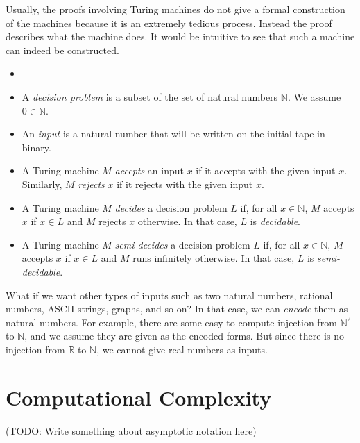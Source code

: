 	Usually, the proofs involving Turing machines do not give a formal construction of the machines because it is an extremely tedious process. Instead the proof describes what the machine does. It would be intuitive to see that such a machine can indeed be constructed.
	
	\begin{defn} \label{def_problem} \begin{itemize}
	    \item []
	    \item A \emph{decision problem} is a subset of the set of natural numbers $\mathbb{N}$. We assume $0 \in \mathbb{N}$.
	    \item An \emph{input} is a natural number that will be written on the initial tape in binary.
	    \item A Turing machine $M$ \emph{accepts} an input $x$ if it accepts with the given input $x$. Similarly, $M$ \emph{rejects} $x$ if it rejects with the given input $x$.
	    \item A Turing machine $M$ \emph{decides} a decision problem $L$ if, for all $x \in \mathbb{N}$, $M$ accepts $x$ if $x \in L$ and $M$ rejects $x$ otherwise. In that case, $L$ is \emph{decidable}.
	    \item A Turing machine $M$ \emph{semi-decides} a decision problem $L$ if, for all $x \in \mathbb{N}$, $M$ accepts $x$ if $x \in L$ and $M$ runs infinitely otherwise. In that case, $L$ is \emph{semi-decidable}.
	\end{itemize} \end{defn}
	
	What if we want other types of inputs such as two natural numbers, rational numbers, ASCII strings, graphs, and so on? In that case, we can \emph{encode} them as natural numbers. For example, there are some easy-to-compute injection from $\mathbb{N}^2$ to $\mathbb{N}$, and we assume they are given as the encoded forms. But since there is no injection from $\mathbb{R}$ to $\mathbb{N}$, we cannot give real numbers as inputs.

    \section{Computational Complexity}
    (TODO: Write something about asymptotic notation here)
        
